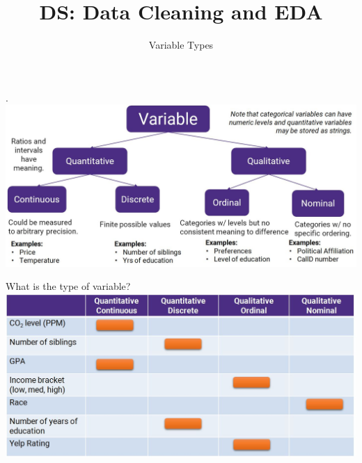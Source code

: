 \documentclass[aspectratio=169]{../latex_main/tntbeamer}  %
\title[Introduction]{DS: Data Cleaning and EDA}
\subtitle{Variable Types}
\begin{document}
	
	\maketitle
	\begin{frame}{.}
	    \includegraphics[scale=.38]{Bild16}
	\end{frame}
	
	
	\begin{frame}{What is the type of variable?}
	    \includegraphics[scale=.4]{Bild17}
	\end{frame}
\end{document}
